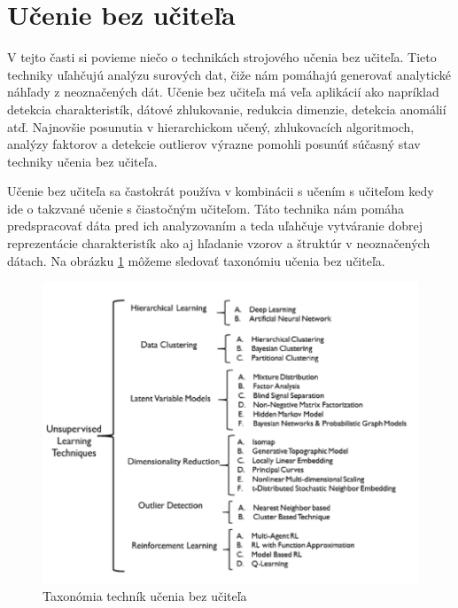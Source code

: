 \section{Učenie bez učiteľa}
V tejto časti si povieme niečo o technikách strojového učenia bez učiteľa. Tieto techniky uľahčujú analýzu surových dat, čiže nám pomáhajú generovať analytické náhľady z neoznačených dát. Učenie bez učiteľa má veľa aplikácií ako napríklad detekcia charakteristík, dátové zhlukovanie, redukcia dimenzie, detekcia anomálií atď. Najnovšie posunutia v hierarchickom učený, zhlukovacích algoritmoch, analýzy faktorov a detekcie outlierov výrazne pomohli posunúť súčasný stav techniky učenia bez učiteľa.\par
Učenie bez učiteľa sa častokrát používa v kombinácii s učením s učiteľom kedy ide o takzvané učenie s čiastočným učiteľom. Táto technika nám pomáha predspracovať dáta pred ich analyzovaním a teda uľahčuje vytváranie dobrej reprezentácie charakteristík ako aj hľadanie vzorov a štruktúr v neoznačených dátach.
Na obrázku \ref{img:bez_ucitela} môžeme sledovať taxonómiu učenia bez učiteľa.
\begin{figure}[H]
	\begin{center}
		\includegraphics[scale=0.6]{img/tax_bez_ucitela.png}
		\caption{Taxonómia techník učenia bez učiteľa \cite{unsupervised}}
		\label{img:bez_ucitela}
	\end{center}
\end{figure}
